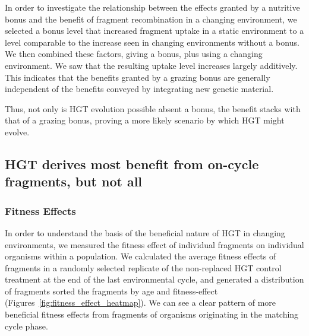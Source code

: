 \documentclass[PhD]{msu-thesis}
\begin{document}
In order to investigate the relationship between the effects granted by a nutritive bonus and the benefit of fragment recombination in a changing environment, we selected a bonus level that increased fragment uptake in a static environment to a level comparable to the increase seen in changing environments without a bonus. We then combined these factors, giving a bonus, plus using a changing environment. We saw that the resulting uptake level increases largely additively. This indicates that the benefits granted by a grazing bonus are generally independent of the benefits conveyed by integrating new genetic material. 

Thus, not only is HGT evolution possible absent a bonus, the benefit stacks with that of a grazing bonus, proving a more likely scenario by which HGT might evolve. %






\subsection{HGT derives most benefit from on-cycle fragments, but not all}



\subsubsection{Fitness Effects}
In order to understand the basis of the beneficial nature of HGT in changing environments, we measured the fitness effect of individual fragments on individual organisms within a population.
We calculated the average fitness effects of fragments in a randomly selected replicate of the non-replaced HGT control treatment at the end of the last environmental cycle, and generated a distribution of fragments sorted the fragments by age and fitness-effect (Figures~\ref{fig:fitness_effect_heatmap}). We can see a clear pattern of more beneficial fitness effects from fragments of organisms originating in the matching cycle phase. 
\end{document}

